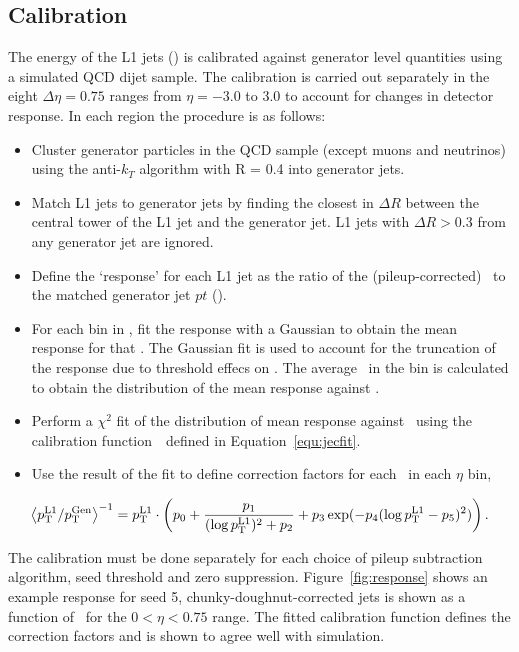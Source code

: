 \subsection{Calibration}
\label{sec:calib}
The energy of the L1 jets (\Lonept) is calibrated against generator level quantities using a simulated QCD dijet sample.
The calibration is carried out separately in the eight $\Delta\eta = 0.75$ ranges from $\eta=-3.0$ to $3.0$ 
to account for changes in detector response. In each region the procedure is as follows:

\begin{itemize}
\item Cluster generator particles in the QCD sample (except muons and neutrinos) using the anti-$k_T$ algorithm with R = 0.4 into generator jets.
\item Match L1 jets to generator jets by finding the closest in $\Delta R$ between the central tower of the L1 jet and the generator jet. L1 jets with 
$\Delta R > 0.3$ from any generator jet are ignored.
\item Define the `response' for each L1 jet as the ratio of the (pileup-corrected) \Lonept~to the matched generator jet $pt$ (\Genpt).
\item For each bin in \Genpt, fit the response with a Gaussian to obtain the mean response for that \Genpt. 
The Gaussian fit is used to account for the truncation of the response due to threshold effecs on \Lonept.
The average \Lonept~in the bin is calculated to obtain the distribution of the mean response against \Lonept.
\item Perform a $\chi^2$ fit of the distribution of mean response against \Lonept~using the calibration
 function~\cite{l1jet_calibration}~defined in Equation~\ref{equ:jecfit}.
\item Use the result of the fit to define correction factors for each \Lonept~in each $\eta$ bin,
\end{itemize}

\begin{equation}
\left<{p_{\text T}^{\text{L1}}}/{p_{\text T}^{\text{Gen}}}\right>^{-1} = {p_{\text T}^{\text{L1}}} \cdot \left ( p_{0} + 
\frac{p_{1}}{(\log {p_{\text T}^{\text{L1}}})^{2}+p_{2}}+p_{3} \exp(-p_{4}
(\log {p_{\text T}^{\text{L1}}}-p_{5} ) ^{2}) \right ).
\label{equ:jecfit}
\end{equation}

The calibration must be done separately for each choice of pileup subtraction algorithm, seed threshold and zero suppression. 
Figure~\ref{fig:response} shows an example response for seed 5, chunky-doughnut-corrected jets is shown as a function of \Lonept~for 
the $0 < \eta < 0.75$ range. The fitted calibration function defines the correction 
factors and is shown to agree well with simulation.

